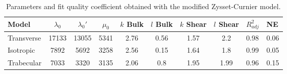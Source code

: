 \begin{table}[!h]
\centering
\caption{Parameters and fit quality coefficient obtained with the modified Zysset-Curnier model.}
\label{TabPanyasantisuk}
\begin{tabular}{l|c|c|c|c|c|c|c}
\toprule
     Model & $\lambda_0$ & $\lambda_0'$ & $\mu_0$ & $k$ Bulk & $l$ Bulk & $k$ Shear & $l$ Shear & $R^2_{adj}$ &   NE \\
\midrule
Transverse &       17133 &        13055 &    5341 &     2.76 &     0.56 &      1.57 &       2.2 &        0.98 & 0.06 \\
 Isotropic &        7892 &         5692 &    3258 &     2.56 &     0.15 &      1.64 &       1.8 &        0.99 & 0.05 \\
Trabecular &        7033 &         3320 &    3135 &     2.06 &      0.8 &      1.95 &      1.99 &        0.96 & 0.15 \\
\bottomrule
\end{tabular}
\end{table}
